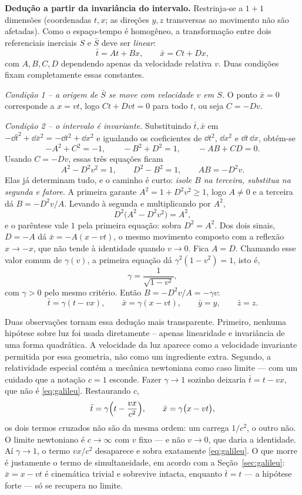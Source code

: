 \documentclass[12pt,a4paper,oneside]{book}
\theoremstyle{rgplain}
\theoremstyle{rgremark}
\begin{document}
\begin{resultado}
\textbf{Dedução a partir da invariância do intervalo.} Restrinja-se a $1+1$
dimensões (coordenadas $t,x$; as direções $y,z$ transversas ao movimento não
são afetadas). Como o espaço-tempo é homogêneo, a transformação entre dois
referenciais inerciais $S$ e $\bar S$ deve ser \emph{linear}:
\[
  \bar t=At+Bx,\qquad \bar x=Ct+Dx,
\]
com $A,B,C,D$ dependendo apenas da velocidade relativa $v$. Duas condições
fixam completamente essas constantes.

\emph{Condição 1 -- a origem de $\bar S$ se move com velocidade $v$ em $S$.} O
ponto $\bar x=0$ corresponde a $x=vt$, logo $Ct+Dvt=0$ para todo $t$, ou seja
$C=-Dv$.

\emph{Condição 2 -- o intervalo é invariante.} Substituindo $\bar t,\bar x$ em
$-\dd \bar t^2+\dd \bar x^2=-\dd t^2+\dd x^2$ e igualando os coeficientes de
$\dd t^2$, $\dd x^2$ e $\dd t\,\dd x$, obtém-se
\[
  -A^2+C^2=-1,\qquad -B^2+D^2=1,\qquad -AB+CD=0.
\]
Usando $C=-Dv$, essas três equações ficam
\[
  A^2-D^2v^2=1,\qquad D^2-B^2=1,\qquad AB=-D^2v.
\]
Elas já determinam tudo, e o caminho é curto: \emph{isole $B$ na terceira,
substitua na segunda e fatore}. A primeira garante $A^2=1+D^2v^2\ge1$, logo
$A\ne0$ e a terceira dá $B=-D^2v/A$. Levando à segunda e multiplicando por
$A^2$,
\[
  D^2\bigl(A^2-D^2v^2\bigr)=A^2 ,
\]
e o parêntese vale $1$ pela primeira equação: sobra $D^2=A^2$. Dos dois
sinais, $D=-A$ dá $\bar x=-A(x-vt)$, o mesmo movimento composto com a reflexão
$x\to-x$, que não tende à identidade quando $v\to0$. Fica $A=D$. Chamando esse
valor comum de $\gamma(v)$, a primeira equação dá $\gamma^2(1-v^2)=1$, isto é,
\[
  \gamma=\frac{1}{\sqrt{1-v^2}},
\]
com $\gamma>0$ pelo mesmo critério. Então $B=-D^2v/A=-\gamma v$:
\begin{equation}
  \bar t=\gamma(t-vx), \qquad
  \bar x=\gamma(x-vt), \qquad
  \bar y=y,\qquad \bar z=z.
  \label{eq:lorentz}
\end{equation}
\end{resultado}

Duas observações tornam essa dedução mais transparente. Primeiro, nenhuma
hipótese sobre luz foi usada diretamente -- apenas linearidade e invariância
de uma forma quadrática. A velocidade da luz aparece como a velocidade
invariante permitida por essa geometria, não como um ingrediente extra.
Segundo, a relatividade especial contém a mecânica newtoniana como caso
limite --- com um cuidado que a notação $c=1$ esconde. Fazer $\gamma\to1$
sozinho deixaria $\bar t=t-vx$, que não é \eqref{eq:galileu}. Restaurando $c$,
\[
  \bar t=\gamma\Bigl(t-\frac{vx}{c^2}\Bigr),\qquad
  \bar x=\gamma\bigl(x-vt\bigr),
\]
os dois termos cruzados não são da mesma ordem: um carrega $1/c^2$, o outro
não. O limite newtoniano é $c\to\infty$ com $v$ fixo --- e não $v\to0$, que
daria a identidade. Aí $\gamma\to1$, o termo $vx/c^2$ desaparece e sobra
exatamente \eqref{eq:galileu}. O que morre é justamente o termo de
simultaneidade, em acordo com a Seção~\ref{sec:galileu}: $\bar x=x-vt$ é
cinemática trivial e sobrevive intacta, enquanto $\bar t=t$ --- a hipótese forte
--- só se recupera no limite.
\end{document}
